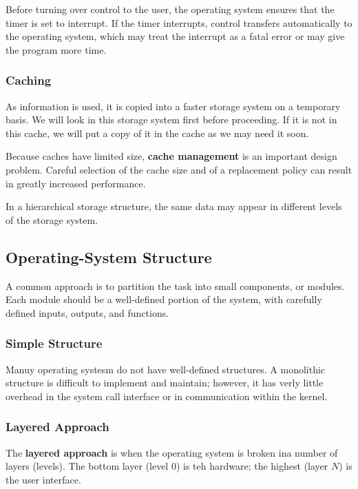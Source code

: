 \documentclass[]{article}
\begin{document}
Before turning over control to the user, the operating system ensures that the
timer is set to interrupt. If the timer interrupts, control transfers
automatically to the operating system, which may treat the interrupt as a fatal
error or may give the program more time.

\subsubsection*{Caching}
As information is used, it is copied into a faster storage system on a temporary
basis. We will look in this storage system first before proceeding. If it is not
in this cache, we will put a copy of it in the cache as we may need it soon.

Because caches have limited size, \textbf{cache management} is an important
design problem. Careful selection of the cache size and of a replacement policy
can result in greatly increased performance.

In a hierarchical storage structure, the same data may appear in different
levels of the storage system.

\subsection*{Operating-System Structure}
A common approach is to partition the task into small components, or modules.
Each module should be a well-defined portion of the system, with carefully
defined inputs, outputs, and functions.

\subsubsection*{Simple Structure}
Manuy operating systesm do not have well-defined structures. A monolithic
structure is difficult to implement and maintain; however, it has verly little
overhead in the system call interface or in communication within the kernel.

\subsubsection*{Layered Approach}
The \textbf{layered approach} is when the operating system is broken ina number
of layers (levels). The bottom layer (level 0) is teh hardware; the highest
(layer $N$) is the user interface.
\end{document}
